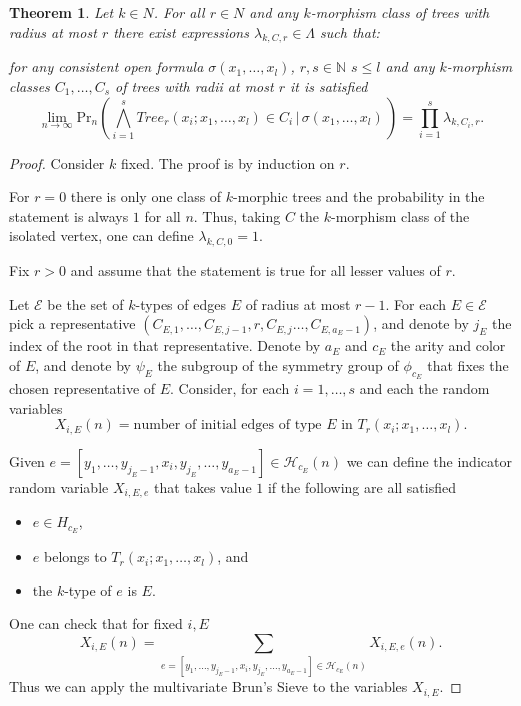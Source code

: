 \documentclass[11pt,notitlepage,a4paper]{article}
\newtheorem{theorem}{Theorem}[section]
\theoremstyle{definition}
\newcommand{\N}{\mathbb{N}}
\newcommand{\Ln}{\lim\limits_{n\to \infty}}
\begin{document}
\begin{theorem} \label{thm:probtrees}
	Let $k\in N$. 
    For all $r\in N$ and any $k$-morphism class of trees with radius
	at most $r$ there exist expressions $\lambda_{k,C,r}\in \Lambda$ 
	such that:
	\item for any consistent open formula $\sigma(x_1,\dots, x_l)$, $r,s\in \N$ $s\leq l$ and any $k$-morphism classes $C_1, 
	\dots, C_s$ of trees with radii
	at most $r$ it is satisfied
	\[ \Ln \mathrm{Pr}_n(\bigwedge_{i=1}^s Tree_r(x_i; x_1, \dots, x_l)\in C_i \, | 
	\, \sigma(x_1,\dots, x_l) \,)= \prod_ {i=1}^s \lambda_{k,C_i,r}.\]	
\end{theorem}
\begin{proof}
Consider $k$ fixed.
The proof is by induction on $r$. 

	\item For $r=0$ there is only one class
	of $k$-morphic trees and the probability in 
	the statement is always $1$ for all $n$.
	Thus, taking $C$ the $k$-morphism class of the isolated
	vertex, one can define $\lambda_{k,C,0}=1$. 
	\item Fix $r>0$ and assume that the statement
	is true for all lesser values of $r$. \par
	Let $\mathcal{E}$ be the set of $k$-types of edges $E$ of
	radius at most $r-1$. For each $E\in \mathcal{E}$
	pick a representative
	$( C_{E,1}, \dots, C_{E,j-1}, r, C_{E,j}\dots, C_{E,a_E-1})$, 
	and denote by $j_E$ the index of the root in that representative. 
	Denote by $a_E$ and $c_E$ the arity and color of $E$, and 
	denote by $\psi_E$ the subgroup of the symmetry group of $\phi_{c_E}$ 
	that fixes the chosen representative of $E$.
	Consider, for each $i=1,\dots, s$ and each the random variables 
	\[X_{i,E}(n)= \text{number of initial edges of type }E \text{ in } 
	T_r(x_i;x_1, \dots, x_l). \]
	
	Given $e=[y_1,\dots,y_{j_E-1},x_i, y_{j_E},\dots ,y_{a_E-1}]\in \mathcal{H}_{c_E}(n)$ we can define the indicator 
	random variable $X_{i,E,e}$ that takes value $1$ if the following are 
	all satisfied
	\begin{itemize}
		\item $e\in H_{c_E}$,
		\item $e$ belongs to $T_r(x_i;x_1, \dots, x_l)$, and
		\item the $k$-type of $e$ is $E$. 	
	\end{itemize} 
	One can check that for fixed $i, E$
	\[X_{i,E}(n)= \sum_{e=[y_1,\dots,y_{j_E-1},x_i,y_{j_E},
	\dots ,y_{a_E-1}]\in \mathcal{H}_{c_E}(n)} X_{i,E,e}(n).\]
	Thus we can apply the multivariate Brun's Sieve to the variables 
	$X_{i, E}$.\par
	

\end{proof}
\end{document}
